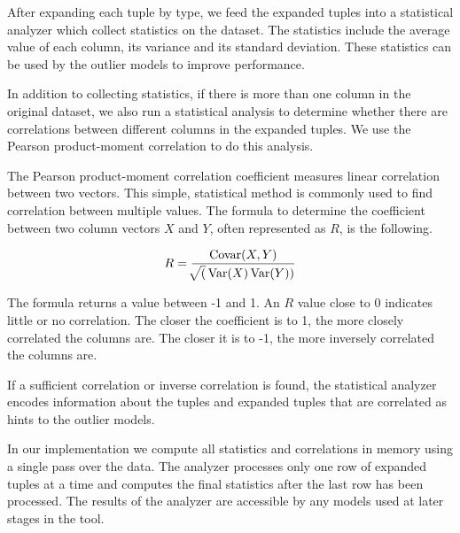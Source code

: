 
After expanding each tuple by type, we feed the expanded tuples into a statistical analyzer which collect statistics on the dataset.
The statistics include the average value of each column, its variance and its standard deviation.
These statistics can be used by the outlier models to improve performance.

In addition to collecting statistics, if there is more than one column in the original dataset, we also run a statistical analysis to determine whether there are correlations between different columns in the expanded tuples.
We use the Pearson product-moment correlation to do this analysis.

The Pearson product-moment correlation coefficient measures linear correlation between two vectors.
This simple, statistical method is commonly used to find correlation between multiple values.
The formula to determine the coefficient between two column vectors $X$ and $Y$, often represented as $R$, is the following.

$$
R = \frac{\operatorname{Covar}(X,Y)}{\sqrt[](\operatorname{Var}(X)\operatorname{Var}(Y))}
$$

The formula returns a value between -1 and 1.
An $R$ value close to 0 indicates little or no correlation.
The closer the coefficient is to 1, the more closely correlated the columns are.
The closer it is to -1, the more inversely correlated the columns are.

If a sufficient correlation or inverse correlation is found, the statistical analyzer encodes information about the tuples and expanded tuples that are correlated as hints to the outlier models.

In our implementation we compute all statistics and correlations in memory using a single pass over the data.
The analyzer processes only one row of expanded tuples at a time and computes the final statistics after the last row has been processed.
The results of the analyzer are accessible by any models used at later stages in the tool.
